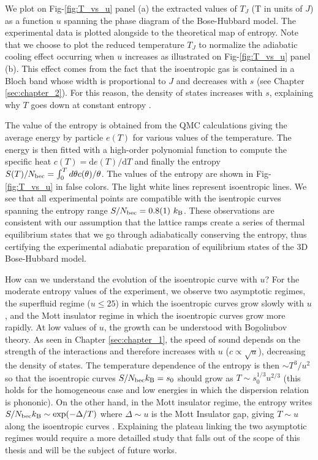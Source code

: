 We plot on Fig-\ref{fig:T_vs_u} panel (a) the extracted values of $T_J$ (T in units of $J$) as a function $u$ spanning the phase diagram of the Bose-Hubbard model. The experimental data is plotted alongside to the theoretical map of entropy. Note that we choose to plot the reduced temperature $T_J$ to normalize the adiabatic cooling effect occurring when $u$ increases as illustrated on Fig-\ref{fig:T_vs_u} panel (b). This effect comes from the fact that the isoentropic gas is contained in a Bloch band whose width is proportional to $J$ and decreases with $s$ (see Chapter \ref{sec:chapter_2}). For this reason, the density of states increases with $s$, explaining why $T$ goes down at constant entropy \cite{yoshimura2008adiabatic}.

The value of the entropy is obtained from the QMC calculations giving the average energy by particle $e(T)$ for various values of the temperature. The energy is then fitted with a high-order polynomial function to compute the specific heat $c(T)=\mathrm{d} e(T) / \mathrm{d} T$ and finally the entropy $S(T) / N_{\rm{bec}}=\int_{0}^{T} d \theta c(\theta) / \theta$. The values of the entropy are shown in Fig-\ref{fig:T_vs_u} in false colors. The light white lines represent isoentropic lines. We see that all experimental points are compatible with the isentropic curves spanning the entropy range $S/N_{\rm{bec}}= 0.8(1) \ k_{\mathrm{B}}$. These observations are consistent with our assumption that the lattice ramps create a series of thermal equilibrium states that we go through adiabatically conserving the entropy, thus certifying the experimental adiabatic preparation of equilibrium states of the 3D Bose-Hubbard model.

How can we understand the evolution of the isoentropic curve with $u$? For the moderate entropy values of the experiment, we observe two asymptotic regimes, the superfluid regime ($u \leq 25$) in which the isoentropic curves grow slowly with $u$, and the Mott insulator regime in which the isoentropic curves grow more rapidly. At low values of $u$, the growth can be understood with Bogoliubov theory. As seen in Chapter \ref{sec:chapter_1}, the speed of sound depends on the strength of the interactions and therefore increases with $u$ ($c \propto \sqrt{u}$), decreasing the density of states. The temperature dependence of the entropy is then $\sim T^3/u^2$ \cite{ho2007intrinsic} so that the isoentropic curves $S/N_{\rm{bec}} k_{\mathrm{B}} =s_0$ should grow as $T \sim s_{0}^{1 / 3} u^{2 / 3}$  (this holds for the homogeneous case and low energies in which the dispersion relation is phononic). On the other hand, in the Mott insulator regime, the entropy writes $S/N_{\rm{bec}} k_{\mathrm{B}} \sim \exp(-\Delta/T)$ where $\Delta \sim u$ is the Mott Insulator gap, giving $T \sim u$ along the isoentropic curves \cite{gerbier2007boson}. Explaining the plateau linking the two asymptotic regimes would require a more detailled study that falls out of the scope of this thesis and will be the subject of future works.


